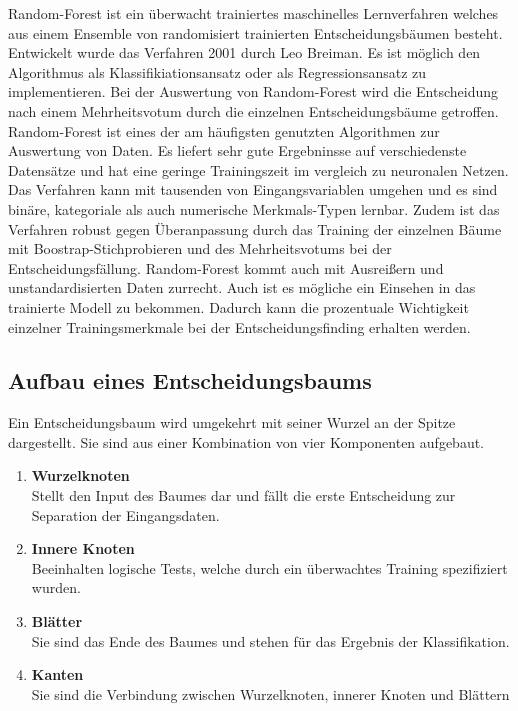 Random-Forest ist ein {\"u}berwacht trainiertes maschinelles Lernverfahren welches aus einem Ensemble von randomisiert trainierten Entscheidungsb{\"a}umen besteht. Entwickelt wurde das Verfahren 2001 durch Leo Breiman. Es ist m{\"o}glich den Algorithmus als Klassifikiationsansatz oder als Regressionsansatz zu implementieren. Bei der Auswertung von Random-Forest wird die Entscheidung nach einem Mehrheitsvotum durch die einzelnen Entscheidungsb{\"a}ume getroffen.
Random-Forest ist eines der am h{\"a}ufigsten genutzten Algorithmen zur Auswertung von Daten. Es liefert sehr gute Ergebninsse auf verschiedenste Datens{\"a}tze und hat eine geringe Trainingszeit im vergleich zu neuronalen Netzen. Das Verfahren kann mit tausenden von Eingangsvariablen umgehen und es sind bin{\"a}re, kategoriale als auch numerische Merkmals-Typen lernbar.
Zudem ist das Verfahren robust gegen {\"U}beranpassung durch das Training der einzelnen B{\"a}ume mit Boostrap-Stichprobieren und des Mehrheitsvotums bei der Entscheidungsf{\"a}llung. 
Random-Forest kommt auch mit Ausrei{\ss}ern und unstandardisierten Daten zurrecht.
Auch ist es m{\"o}gliche ein Einsehen in das trainierte Modell zu bekommen. Dadurch kann die prozentuale Wichtigkeit einzelner Trainingsmerkmale bei der Entscheidungsfinding erhalten werden.

\subsection{Aufbau eines Entscheidungsbaums}
\label{subsec:Aufbau eines Entscheidungsbaums}

Ein Entscheidungsbaum wird umgekehrt mit seiner Wurzel an der Spitze dargestellt.
Sie sind aus einer Kombination von vier Komponenten aufgebaut.


\begin{enumerate}

\item[] \textbf{Wurzelknoten}\hfill \\
Stellt den Input des Baumes dar und f{\"a}llt die erste Entscheidung zur Separation der Eingangsdaten.

\item[] \textbf{Innere Knoten}\hfill \\
Beeinhalten logische Tests, welche durch ein {\"u}berwachtes Training spezifiziert wurden.


\item[] \textbf{Bl{\"a}tter}\hfill \\
Sie sind das Ende des Baumes und stehen f{\"u}r das Ergebnis der Klassifikation.

\item[] \textbf{Kanten}\hfill \\
Sie sind die Verbindung zwischen Wurzelknoten, innerer Knoten und Bl{\"a}ttern
\end{enumerate}


